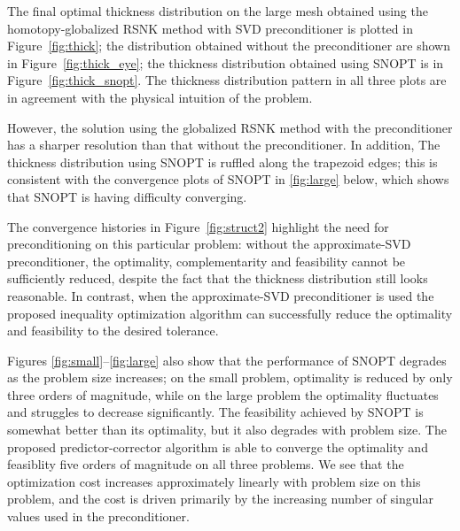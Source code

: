     
The final optimal thickness distribution on the large mesh obtained using the homotopy-globalized RSNK method with SVD preconditioner is plotted in Figure~\ref{fig:thick}; the distribution obtained without the preconditioner are shown in Figure~\ref{fig:thick_eye}; the thickness distribution obtained using SNOPT is in Figure~\ref{fig:thick_snopt}. 
The thickness distribution pattern in all three plots are in agreement with the physical
intuition of the problem. 

However, the solution using the globalized RSNK method with the preconditioner has a sharper resolution than that without the preconditioner. In addition, The thickness distribution using SNOPT is ruffled along the trapezoid edges; this is consistent with the convergence plots of SNOPT in \ref{fig:large} below, which shows that SNOPT is having difficulty converging. 


The convergence histories in Figure~\ref{fig:struct2} highlight the need for preconditioning
on this particular problem: without the approximate-SVD preconditioner, the optimality, complementarity and 
feasibility cannot be sufficiently reduced, despite the fact that the thickness distribution 
still looks reasonable. 
In contrast, when the approximate-SVD preconditioner is used the
proposed inequality optimization algorithm can successfully reduce the optimality 
and feasibility to the desired tolerance.

Figures \ref{fig:small}--\ref{fig:large} also show that the performance of SNOPT
degrades as the problem size increases; on the small problem, optimality is
reduced by only three orders of magnitude, while on the large problem the optimality
fluctuates and struggles to decrease significantly. The feasibility achieved by SNOPT is somewhat better
than its optimality, but it also degrades with problem size.  The proposed
predictor-corrector algorithm is able to converge the optimality and feasiblity
five orders of magnitude on all three problems. We see that the
optimization cost increases approximately linearly with problem size on this
problem, and the cost is driven primarily by the increasing number of singular values used
in the preconditioner. 

